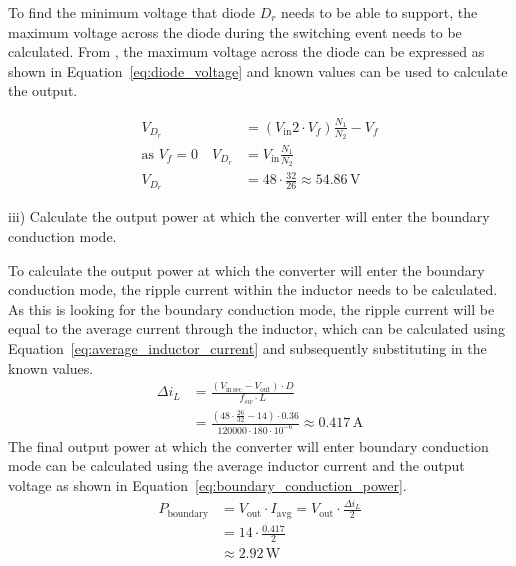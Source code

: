 \documentclass[a4paper, 12pt, titlepage]{report}
\begin{document}
To find the minimum voltage that diode \(D_r\) needs to be able to support, the maximum voltage across the diode during the switching event needs to be calculated. From \cite{Power-Supply-Design-P7}, the maximum voltage across the diode can be expressed as shown in Equation~\ref{eq:diode_voltage} and known values can be used to calculate the output.

\begin{equation}
    \begin{split}
        V_{D_r} &= (V_{\mathrm{in}} 2 \cdot V_f) \frac{N_1}{N_2} -V_f\\
        \text{as } V_f = 0 \quad V_{D_r}  &= V_{\mathrm{in}} \frac{N_1}{N_2} \\
        V_{D_r} &= 48 \cdot \frac{32}{26} \approx 54.86\,\mathrm{V}
        \label{eq:diode_voltage}
    \end{split}
\end{equation}

iii) Calculate the output power at which the converter will enter the boundary conduction mode.

To calculate the output power at which the converter will enter the boundary conduction mode, the ripple current within the inductor needs to be calculated. As this is looking for the boundary conduction mode, the ripple current will be equal to the average current through the inductor, which can be calculated using Equation~\ref{eq:average_inductor_current} and subsequently substituting in the known values.
\begin{equation}
    \begin{split}
        \varDelta i_L &= \frac{(V_\mathrm{in\,sec} - V_\mathrm{out})\cdot D}{f_{sw} \cdot L}\\
        &= \frac{(48 \cdot \frac{26}{32} - 14)\cdot 0.36}{120000 \cdot 180 \cdot 10^{-6}} \approx 0.417\,\mathrm{A}
    \end{split}
    \label{eq:average_inductor_current}
\end{equation}
The final output power at which the converter will enter boundary conduction mode can be calculated using the average inductor current and the output voltage as shown in Equation~\ref{eq:boundary_conduction_power}.
\begin{equation}
    \begin{split}
        P_{\mathrm{boundary}} &= V_{\mathrm{out}} \cdot I_{\mathrm{avg}} = V_{\mathrm{out}} \cdot \frac{\varDelta i_L}{2} \\
            &= 14 \cdot \frac{0.417}{2} \\
            &\approx 2.92\,\mathrm{W}
    \end{split}
    \label{eq:boundary_conduction_power}
\end{equation}
\end{document}
